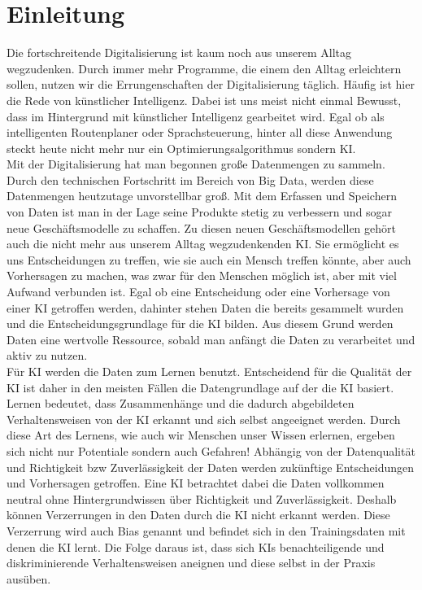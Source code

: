 \chapter{Einleitung}
    \begin{onehalfspace}    
        \label{sec:einleitung}
        Die fortschreitende Digitalisierung ist kaum noch aus unserem Alltag wegzudenken. Durch immer mehr Programme, die einem den Alltag erleichtern sollen, nutzen wir die Errungenschaften der Digitalisierung täglich. Häufig ist hier die Rede von künstlicher Intelligenz. Dabei ist uns meist nicht einmal Bewusst, dass im Hintergrund mit künstlicher Intelligenz gearbeitet wird. Egal ob als intelligenten Routenplaner oder Sprachsteuerung, hinter all diese Anwendung steckt heute nicht mehr nur ein Optimierungsalgorithmus sondern \ac{KI}. 
        \\
        Mit der Digitalisierung hat man begonnen große Datenmengen zu sammeln. Durch den technischen Fortschritt im Bereich von Big Data, werden diese Datenmengen heutzutage unvorstellbar groß. Mit dem Erfassen und Speichern von Daten ist man in der Lage seine Produkte stetig zu verbessern und sogar neue Geschäftsmodelle zu schaffen. Zu diesen neuen Geschäftsmodellen gehört auch die nicht mehr aus unserem Alltag wegzudenkenden \ac{KI}. Sie ermöglicht es uns Entscheidungen zu treffen, wie sie auch ein Mensch treffen könnte, aber auch Vorhersagen zu machen, was zwar für den Menschen möglich ist, aber mit viel Aufwand verbunden ist. Egal ob eine Entscheidung oder eine Vorhersage von einer \ac{KI} getroffen werden, dahinter stehen Daten die bereits gesammelt wurden und die Entscheidungsgrundlage für die \ac*{KI} bilden. Aus diesem Grund werden Daten eine wertvolle Ressource, sobald man anfängt die Daten zu verarbeitet und aktiv zu nutzen. 
        \\
        Für \ac*{KI} werden die Daten zum Lernen benutzt. Entscheidend für die Qualität der \ac*{KI} ist daher in den meisten Fällen die Datengrundlage auf der die \ac*{KI} basiert. Lernen bedeutet, dass Zusammenhänge und die dadurch abgebildeten Verhaltensweisen von der \ac*{KI} erkannt und sich selbst angeeignet werden. Durch diese Art des Lernens, wie auch wir Menschen unser Wissen erlernen, ergeben sich nicht nur Potentiale sondern auch Gefahren! Abhängig von der Datenqualität und Richtigkeit \ac*{bzw} Zuverlässigkeit der Daten werden zukünftige Entscheidungen und Vorhersagen getroffen. Eine \ac*{KI} betrachtet dabei die Daten vollkommen neutral ohne Hintergrundwissen über Richtigkeit und Zuverlässigkeit. Deshalb können Verzerrungen in den Daten durch die \ac*{KI} nicht erkannt werden. Diese Verzerrung wird auch Bias genannt und befindet sich in den Trainingsdaten mit denen die \ac*{KI} lernt. Die Folge daraus ist, dass sich \ac*{KI}s benachteiligende und diskriminierende Verhaltensweisen aneignen und diese selbst in der Praxis ausüben.

\end{onehalfspace}
